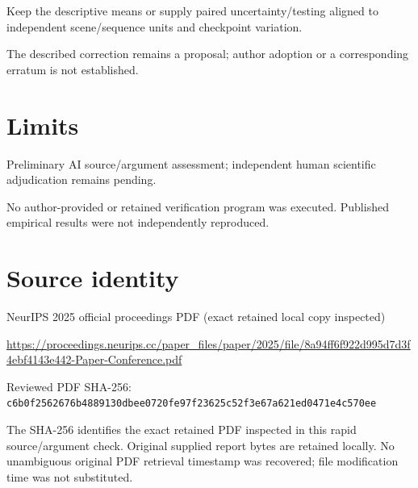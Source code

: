 \documentclass[11pt]{article}
\begin{document}
Keep the descriptive means or supply paired uncertainty/testing aligned to independent scene/sequence units and checkpoint variation.

The described correction remains a proposal; author adoption or a corresponding erratum is not established.

\section*{Limits}

Preliminary AI source/argument assessment; independent human scientific adjudication remains pending.\par

No author-provided or retained verification program was executed. Published empirical results were not independently reproduced.\par

\section*{Source identity}

NeurIPS 2025 official proceedings PDF (exact retained local copy inspected)

\url{https://proceedings.neurips.cc/paper_files/paper/2025/file/8a94ff6f922d995d7d3f4ebf4143e442-Paper-Conference.pdf}

Reviewed PDF SHA-256: \nolinkurl{c6b0f2562676b4889130dbee0720fe97f23625c52f3e67a621ed0471e4c570ee}

The SHA-256 identifies the exact retained PDF inspected in this rapid source/argument check. Original supplied report bytes are retained locally. No unambiguous original PDF retrieval timestamp was recovered; file modification time was not substituted.
\end{document}
